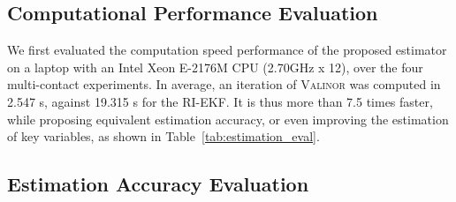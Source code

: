 \documentclass[10pt,twocolumn]{ICCAS}
\begin{document}
\subsection{Computational Performance Evaluation}\label{subsec:computation_time}

We first evaluated the computation speed performance of the proposed estimator on a laptop with an Intel Xeon E-2176M CPU (2.70GHz x 12), over the four multi-contact experiments. In average, an iteration of {\scshape Valinor} was computed in 2.547 \textmu s, against 19.315 \textmu s for the RI-EKF. It is thus more than 7.5 times faster, while proposing equivalent estimation accuracy, or even improving the estimation of key variables, as shown in Table~\ref{tab:estimation_eval}.

\subsection{Estimation Accuracy Evaluation} ~\label{subsec:est_accur_eval}
\end{document}
